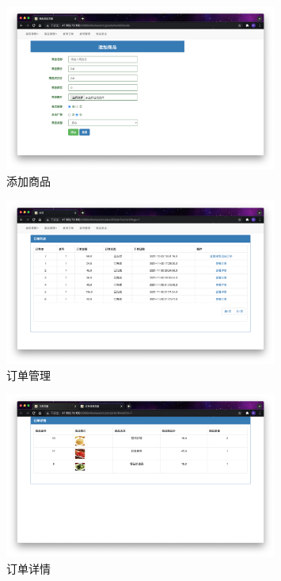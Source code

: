 \documentclass[11pt]{homework}
\begin{document}
    \begin{figure}[h]
      \centering
      \includegraphics[width=0.8\textwidth]{添加商品}
      \caption{添加商品}
      \label{添加商品}
    \end{figure}

    \begin{figure}[h]
      \centering
      \includegraphics[width=0.8\textwidth]{订单管理}
      \caption{订单管理}
      \label{订单管理}
    \end{figure}

    \begin{figure}[h]
      \centering
      \includegraphics[width=0.8\textwidth]{订单详情}
      \caption{订单详情}
      \label{订单详情}
    \end{figure}
\end{document}

